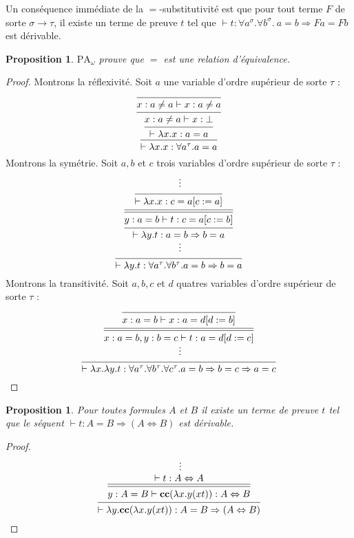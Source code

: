\documentclass[a4paper,12pt]{article}
\newtheorem{prop}[theo]{Proposition}
\theoremstyle{rmqstyle}
\newcommand{\PA}{\mathrm{PA}}
\renewcommand{\implies}{\Rightarrow}
\renewcommand{\iff}{\Leftrightarrow}
\newcommand{\cc}{\mathbf{cc}}
\begin{document}
Un conséquence immédiate de la $=$-substitutivité est que pour tout terme $F$ de sorte $\sigma \to \tau$, il existe un terme de preuve $t$ tel que $\vdash t : \forall a^\sigma. \forall b^\sigma. \ a = b \implies Fa = Fb$ est dérivable. 

\begin{prop}
$\PA_\omega$ prouve que $=$ est une relation d'équivalence.
\end{prop}

\begin{proof}
Montrons la réflexivité. Soit $a$ une variable d'ordre supérieur de sorte $\tau$ :
$$
\begin{prooftree}[center=false]
\infer0{ x : a \neq a \vdash x : a \neq a}
\infer1{x : a \neq a \vdash x : \bot}
\infer1{\vdash \lambda x. x : a = a}
\infer1{\vdash \lambda x. x : \forall a^\tau. a = a}
\end{prooftree}
$$
Montrons la symétrie. Soit $a, b$ et $c$ trois variables d'ordre supérieur de sorte $\tau$ :
$$
\begin{prooftree}[center=false]
\hypo{}
\ellipsis{}{}
\infer1{\vdash \lambda x.x : c = a[c := a]}
\infer[double]1{y : a = b \vdash t : c = a[c := b]}
\infer1{\vdash \lambda y. t : a = b \implies b = a}
\ellipsis{}{}
\infer1{\vdash \lambda y. t : \forall a^\tau. \forall b^\tau. a = b \implies b = a}
\end{prooftree}
$$
Montrons la transitivité. Soit $a, b, c$ et $d$ quatres variables d'ordre supérieur de sorte $\tau$ :
$$
\begin{prooftree}[center=false]
\infer0{x : a = b \vdash x : a = d[d := b]}
\infer[double]1{x : a = b, y : b = c \vdash t : a = d[d := c]}
\ellipsis{}{}
\infer1{\vdash \lambda x. \lambda y. t : \forall a^\tau. \forall b^\tau. \forall c^\tau. a = b \implies b = c \implies a = c}
\end{prooftree}
$$
\end{proof}

\begin{prop}
Pour toutes formules $A$ et $B$ il existe un terme de preuve $t$ tel que le séquent $\vdash t : A = B \implies (A \iff B)$ est dérivable.
\end{prop}

\begin{proof}
$$
\begin{prooftree}[center=false]
\hypo{}
\ellipsis{}{ \vdash t : A \iff A }
\infer[double]1{y : A = B \vdash \cc(\lambda x. y(xt)) : A \iff B}
\infer1{\vdash \lambda y. \cc(\lambda x. y(xt)) : A = B \implies (A \iff B)}
\end{prooftree}
$$
\end{proof}
\end{document}
